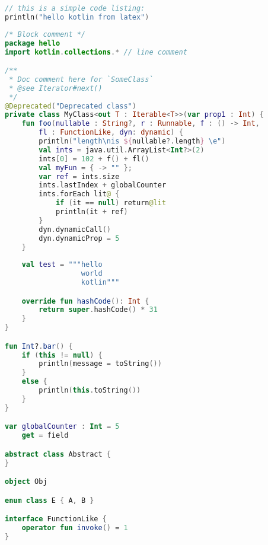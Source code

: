 \documentclass{article}
\begin{document}
\begin{lstlisting}[caption={Simple code listing.}, label={lst:example1}, language=Kotlin]
// this is a simple code listing:
println("hello kotlin from latex")
\end{lstlisting}

\begin{lstlisting}[caption={Example kotlin code.}, label={lst:example2}, language=Kotlin]
/* Block comment */
package hello
import kotlin.collections.* // line comment

/**
 * Doc comment here for `SomeClass`
 * @see Iterator#next()
 */
@Deprecated("Deprecated class")
private class MyClass<out T : Iterable<T>>(var prop1 : Int) {
    fun foo(nullable : String?, r : Runnable, f : () -> Int, 
        fl : FunctionLike, dyn: dynamic) {
        println("length\nis ${nullable?.length} \e")
        val ints = java.util.ArrayList<Int?>(2)
        ints[0] = 102 + f() + fl()
        val myFun = { -> "" };
        var ref = ints.size
        ints.lastIndex + globalCounter
        ints.forEach lit@ {
            if (it == null) return@lit
            println(it + ref)
        }
        dyn.dynamicCall()
        dyn.dynamicProp = 5
    }
    
    val test = """hello
                  world
                  kotlin"""

    override fun hashCode(): Int {
        return super.hashCode() * 31
    }
}

fun Int?.bar() {
    if (this != null) {
        println(message = toString())
    }
    else {
        println(this.toString())
    }
}

var globalCounter : Int = 5
    get = field

abstract class Abstract {
}

object Obj

enum class E { A, B }

interface FunctionLike {
    operator fun invoke() = 1
}
\end{lstlisting}
\end{document}
